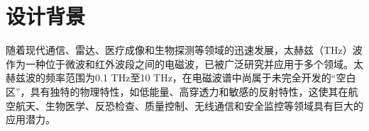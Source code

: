 \documentclass[12pt,hyperref,a4paper,UTF8]{ctexart}
\begin{document}
\cover

%
%

\thispagestyle{empty} %
\newpage
\begin{abstract}
随着现代通信、雷达、医疗成像和生物探测等领域的迅速发展，太赫兹波在多个领域展现出广泛的应用潜力。氮化镓（GaN）作为一种具有优异电学和热学性能的宽禁带半导体，已成为高频和高功率应用的理想材料。本设计报告提出了一种基于GaN材料的耿氏二极管振荡器设计方案，旨在开发一款工作频率超过2 GHz的GaN耿氏二极管，采用简化结构来提升频率稳定性和功率输出。

GaN耿氏二极管利用负微分迁移率效应（即耿氏效应），通过优化材料和结构设计，克服传统GaAs耿氏二极管在高频和高功率应用中的局限性。与传统的GaAs材料相比，GaN材料具有更宽的禁带结构、更高的电子迁移率和更强的热稳定性，能够在更高频率和功率下稳定工作，从而推动太赫兹源技术的发展。

然而，GaN材料的缺陷问题和制造工艺仍然是该领域发展的瓶颈。本文通过对GaN耿氏二极管的工作原理、性能优化以及实际应用前景的深入分析，
创新性的提出了新的耿氏管结构并提出优化设计方案，旨在提升其工作频率、功率输出以及系统稳定性，为未来太赫兹波段的应用提供创新的解决方案。
\end{abstract}

\newpage
\tableofcontents

\newpage




\section{设计背景}

随着现代通信、雷达、医疗成像和生物探测等领域的迅速发展，太赫兹（THz）波作为一种位于微波和红外波段之间的电磁波，已被广泛研究并应用于多个领域。太赫兹波的频率范围为0.1 THz至10 THz，在电磁波谱中尚属于未完全开发的“空白区”，具有独特的物理特性，如低能量、高穿透力和敏感的反射特性，这使其在航空航天、生物医学、反恐检查、质量控制、无线通信和安全监控等领域具有巨大的应用潜力。
\end{document}
